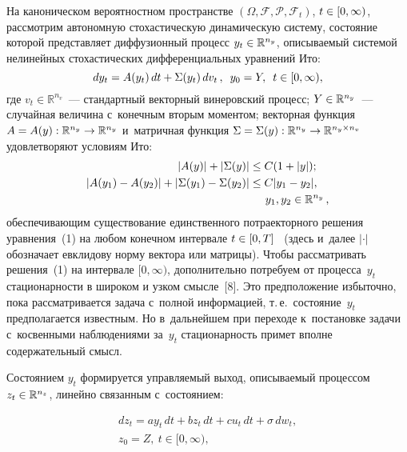 \begin{multicols}{2}
     На каноническом вероятностном пространстве $(\Omega, 
\mathcal{F},\mathcal{P},\mathcal{F}_t)$, $t\hm\in [0,\infty)$, рас\-смот\-рим 
автономную сто\-ха\-сти\-че\-скую динамическую сис\-те\-му, со\-сто\-яние которой 
пред\-став\-ля\-ет диффузионный процесс $y_t\hm\in \mathbb{R}^{n_y}$, 
опи\-сы\-ва\-емый сис\-те\-мой нелинейных сто\-ха\-сти\-че\-ских дифференциальных 
уравнений Ито:
     \begin{equation}
     dy_t= A(y_t)\,dt+\Sigma(y_t)\,dv_t\,,\enskip y_0=Y,\enskip t\in [0,\infty),
     \label{e1-bos}
     \end{equation}
   где $v_t\in \mathbb{R}^{n_v}$~--- стандартный векторный винеровский 
процесс; $Y\hm\in \mathbb{R}^{n_y}$~--- случайная величина с~конечным 
вторым моментом; векторная функция $A\hm= A(y): \mathbb{R}^{n_y}\hm\to 
\mathbb{R}^{n_y}$ и~мат\-рич\-ная функция $\Sigma\hm= \Sigma(y): 
\mathbb{R}^{n_y}\hm\to \mathbb{R}^{n_y\times n_v}$ удовле\-тво\-ря\-ют 
условиям Ито:
\begin{align*}
\vert A(y)\vert +\vert \Sigma(y)\vert &\leq C(1+\vert y\vert);\\
\vert A(y_1)- A(y_2)\vert +\vert \Sigma(y_1) -\Sigma(y_2)\vert&\leq C\vert y_1-
y_2\vert,\\
& \hspace*{5mm}y_1,y_2\in\mathbb{R}^{n_y}\,,
\end{align*}
обеспечивающим существование единственного потраекторного решения 
уравнения~(1) на любом конечном интервале $t\hm\in [0,T]$~\cite{7-bos} 
(здесь и~далее $\vert\cdot\vert$ обозначает евклидову норму вектора или 
мат\-ри\-цы). Чтобы рассматривать решения~(1) на интервале $[0,\infty)$, 
дополнительно по\-тре\-бу\-ем от процесса~$y_t$ стационарности в широком и 
узком смысле~[8]. Это предположение избыточно, пока рассматривается 
задача с~полной информацией, т.\,е.\ состояние~$y_t$ предполагается 
известным. Но в~дальнейшем при переходе к~постановке задачи 
с~косвенными наблюдениями за~$y_t$ ста\-ци\-о\-нар\-ность примет вполне 
содержательный смысл.

     Состоянием $y_t$ формируется управ\-ля\-емый выход, опи\-сы\-ва\-емый 
процессом $z_t\hm\in\mathbb{R}^{n_z}$, линейно связанным с~со\-сто\-я\-нием:

\vspace*{-3pt}

\noindent
     \begin{multline}
     dz_t=ay_t\, dt +bz_t \,dt+c u_t\, dt+\sigma\, dw_t,\\
     z_0=Z,\ t\in [0,\infty),
     \label{e2-bos}
     \end{multline}
     

\end{multicols}
